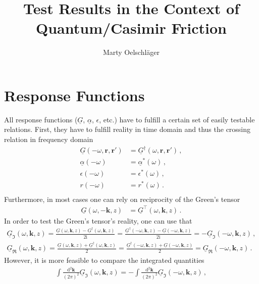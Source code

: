 \documentclass[11pt]{article}
\title{Test Results in the Context of Quantum/Casimir Friction}
\author{Marty Oelschläger}
\newcommand{\vv}[1]{\mathbf{#1}}
\newcommand{\ii}[0]{\mathrm{i}}
\newcommand{\dd}[0]{\mathrm{d}}
\begin{document}
\maketitle
\section{Response Functions}
All response functions ($\underline{G}$, $\underline{\alpha}$, $\epsilon$, etc.) have to fulfill a certain set of easily testable relations. First, they have to fulfill reality in time domain and thus the crossing relation in frequency domain
\begin{align}
\underline{G}(-\omega,\vv r, \vv r') &= \underline{G}^\dagger(\omega,\vv r, \vv r')\,,  \\
\underline{\alpha}(-\omega) &= \underline{\alpha}^*(\omega) \,,\\
\epsilon(-\omega) &= \epsilon^*(\omega)  \,,\\
r(-\omega) &= r^*(\omega)  \,.\\
\end{align}
Furthermore, in most cases one can rely on reciprocity of the Green's tensor
\begin{align}
\underline{G}(\omega,-\vv k,z) &= \underline{G}^\intercal(\omega,\vv k, z)\,.
\end{align}
In order to test the Green's tensor's reality, one can use that
\begin{align}
\underline{G}_\Im(\omega,\vv k, z) =\frac{\underline{G}(\omega,\vv k, z) - \underline{G}^\dagger(\omega,\vv k, z)}{2\ii}=
\frac{\underline{G}^\dagger(-\omega,\vv k, z) - \underline{G}(-\omega,\vv k, z)}{2\ii}= -\underline{G}_\Im(-\omega,\vv k, z)\,,\\
\underline{G}_\Re(\omega,\vv k, z) =\frac{\underline{G}(\omega,\vv k, z) + \underline{G}^\dagger(\omega,\vv k, z)}{2}=
\frac{\underline{G}^\dagger(-\omega,\vv k, z) + \underline{G}(-\omega,\vv k, z)}{2}= \underline{G}_\Re(-\omega,\vv k, z)
\,.
\end{align}
However, it is more feasible to compare the integrated quantities 
\begin{align}
  \int\frac{\dd^2\vv k}{(2\pi)^2}
\underline{G}_\Im(\omega,\vv k, z) = 
-\int\frac{\dd^2\vv k}{(2\pi)^2} \underline{G}_\Im(-\omega,\vv k, z)\,,\\
\end{align}
\end{document}
